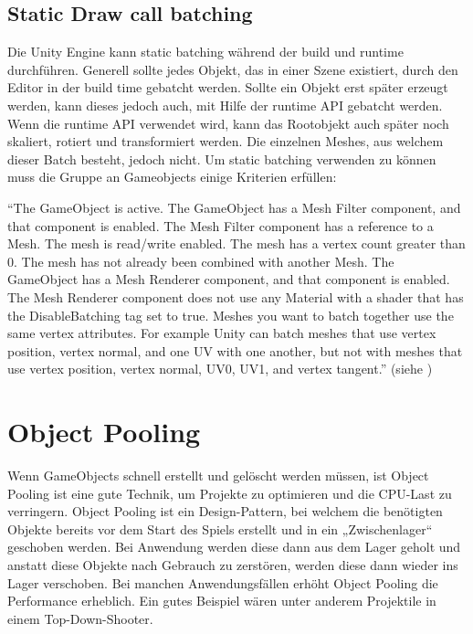 \subsection{Static Draw call batching}
Die Unity Engine kann static batching während der build und runtime durchführen. Generell sollte jedes Objekt, das in einer Szene existiert, durch den Editor in der build time gebatcht werden. Sollte ein Objekt erst später erzeugt werden, kann dieses jedoch auch, mit Hilfe der runtime API gebatcht werden. Wenn die runtime API verwendet wird, kann das Rootobjekt auch später noch skaliert, rotiert und transformiert werden. Die einzelnen Meshes, aus welchem dieser Batch besteht, jedoch nicht. Um static batching verwenden zu können muss die Gruppe an Gameobjects einige Kriterien erfüllen:

"`The GameObject is active.
The GameObject has a Mesh Filter
component, and that component is enabled.
The Mesh Filter component has a reference to a Mesh.
The mesh is read/write enabled.
The mesh has a vertex count greater than 0.
The mesh has not already been combined with another Mesh.
The GameObject has a Mesh Renderer
component, and that component is enabled.
The Mesh Renderer component does not use any Material with a shader
that has the DisableBatching tag set to true.
Meshes you want to batch together use the same vertex attributes. For example Unity can batch meshes that use vertex position, vertex normal, and one UV with one another, but not with meshes that use vertex position, vertex normal, UV0, UV1, and vertex tangent."'
(siehe \cite{_drawcallbatching})


\section{Object Pooling}
Wenn GameObjects schnell erstellt und gelöscht werden müssen, ist Object Pooling ist eine gute Technik, um Projekte zu optimieren und die CPU-Last zu verringern. Object Pooling ist ein Design-Pattern, bei welchem die benötigten Objekte bereits vor dem Start des Spiels erstellt und in ein „Zwischenlager“ geschoben werden. Bei Anwendung werden diese dann aus dem Lager geholt und anstatt diese Objekte nach Gebrauch zu zerstören, werden diese dann wieder ins Lager verschoben. Bei manchen Anwendungsfällen erhöht Object Pooling die Performance erheblich. Ein gutes Beispiel wären unter anderem Projektile in einem Top-Down-Shooter.
\cite{_objectpooling}

